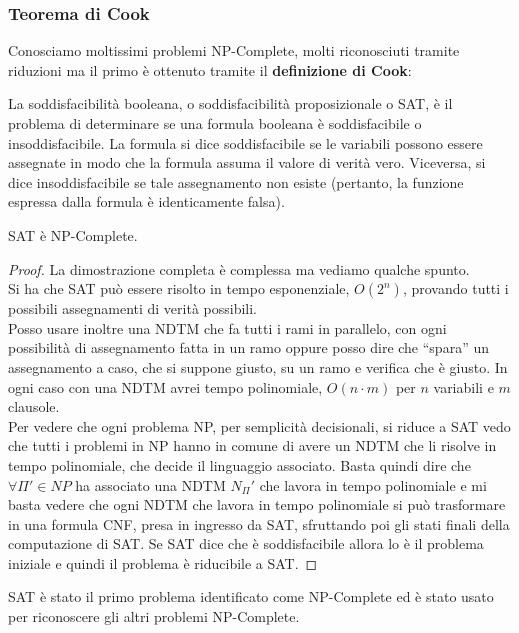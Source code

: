 \subsubsection{Teorema di Cook}
Conosciamo moltissimi problemi NP-Complete, molti riconosciuti tramite riduzioni
ma il primo è ottenuto tramite il \textbf{definizione di Cook}:
\begin{definizione}[SAT]
  La soddisfacibilità booleana, o soddisfacibilità proposizionale o SAT, è il problema di determinare se una formula booleana è soddisfacibile o insoddisfacibile. La formula si dice soddisfacibile se le variabili possono essere assegnate in modo che la formula assuma il valore di verità vero. Viceversa, si dice insoddisfacibile se tale assegnamento non esiste (pertanto, la funzione espressa dalla formula è identicamente falsa). 
\end{definizione}
\begin{definizione}
  SAT è NP-Complete. 
\end{definizione}
\begin{proof}
  La dimostrazione completa è complessa ma vediamo qualche spunto.\\
  Si ha che SAT può essere risolto in tempo esponenziale, $O(2^n)$, provando
  tutti i possibili assegnamenti di verità possibili.\\
  Posso usare inoltre una NDTM che fa tutti i rami in parallelo, con ogni
  possibilità di assegnamento fatta in un ramo oppure posso dire che ``spara''
  un assegnamento a caso, che si suppone giusto, su un ramo e verifica che è
  giusto. In ogni caso con una NDTM avrei tempo polinomiale, $O(n\cdot m)$ per
  $n$ variabili e $m$ clausole.\\
  Per vedere che ogni problema NP, per semplicità decisionali, si riduce a SAT
  vedo che tutti i problemi in NP hanno in comune di avere un NDTM che li
  risolve in tempo polinomiale, che decide il linguaggio associato. Basta quindi
  dire che $\forall\Pi'\in NP$ ha associato una NDTM $N_\Pi'$ che lavora in
  tempo polinomiale e mi basta vedere che ogni NDTM che lavora in tempo
  polinomiale si può trasformare in una formula CNF, presa in ingresso da SAT,
  sfruttando poi gli stati finali della computazione di SAT. Se SAT dice che è
  soddisfacibile allora lo è il problema iniziale e quindi il problema è
  riducibile a SAT.
\end{proof}
SAT è stato il primo problema identificato come NP-Complete ed è stato usato per
riconoscere gli altri problemi NP-Complete.\\
